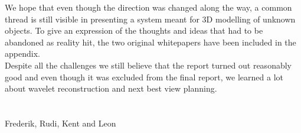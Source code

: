 We hope that even though the direction was changed along the way, a common thread is still visible in presenting a system meant for 3D modelling of unknown objects. To give an expression of the thoughts and ideas that had to be abandoned as reality hit, the two original whitepapers have been included in the appendix.\\

Despite all the challenges we still believe that the report turned out reasonably good and even though it was excluded from the final report, we learned a lot about wavelet reconstruction and next best view planning.\\
 \\
  \\
 Frederik, Rudi, Kent and Leon